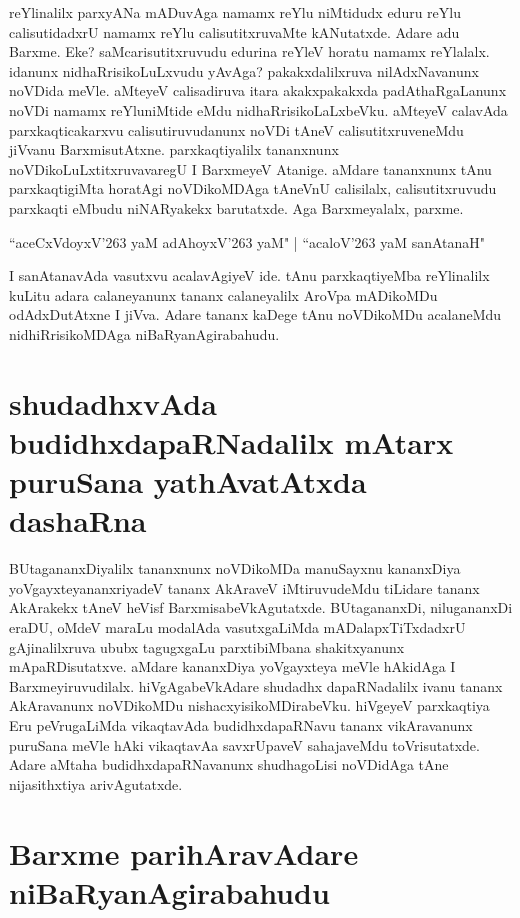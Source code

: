 reYlinalilx parxyANa mADuvAga namamx reYlu niMtidudx eduru reYlu calisutidadxrU namamx reYlu calisutitxruvaMte kANutatxde. Adare adu Barxme. Eke? saMcarisutitxruvudu edurina reYleV horatu namamx reYlalalx. idanunx nidhaRrisikoLuLxvudu yAvAga? pakakxdalilxruva nilAdxNavanunx noVDida meVle. aMteyeV calisadiruva itara akakxpakakxda padAthaRgaLanunx noVDi namamx reYluniMtide eMdu nidhaRrisikoLaLxbeVku. aMteyeV calavAda parxkaqticakarxvu calisutiruvudanunx noVDi tAneV calisutitxruveneMdu jiVvanu BarxmisutAtxne. parxkaqtiyalilx tananxnunx noVDikoLuLxtitxruvavaregU I BarxmeyeV Atanige. aMdare tananxnunx tAnu parxkaqtigiMta horatAgi noVDikoMDAga tAneVnU calisilalx, calisutitxruvudu parxkaqti eMbudu niNARyakekx barutatxde. Aga Barxmeyalalx, parxme.

\begin{shloka}
``aceCxVdoyxV\char'263 yaM adAhoyxV\char'263 yaM" | ``acaloV\char'263 yaM sanAtanaH"\label{36}
\end{shloka}

I sanAtanavAda vasutxvu acalavAgiyeV ide. tAnu parxkaqtiyeMba reYlinalilx kuLitu adara calaneyanunx tananx calaneyalilx AroVpa mADikoMDu odAdxDutAtxne I jiVva. Adare tananx kaDege tAnu noVDikoMDu acalaneMdu nidhiRrisikoMDAga niBaRyanAgirabahudu.

\section*{shudadhxvAda budidhxdapaRNadalilx mAtarx puruSana yathAvatAtxda dashaRna}

BUtagananxDiyalilx  tananxnunx noVDikoMDa manuSayxnu kananxDiya yoVgayxteyananxriyadeV tananx AkAraveV iMtiruvudeMdu tiLidare tananx AkArakekx tAneV heVisf BarxmisabeVkAgutatxde. BUtagananxDi, nilugananxDi eraDU, oMdeV maraLu modalAda vasutxgaLiMda mADalapxTiTxdadxrU gAjinalilxruva ububx tagugxgaLu parxtibiMbana shakitxyanunx mApaRDisutatxve. aMdare kananxDiya yoVgayxteya meVle hAkidAga I Barxmeyiruvudilalx. hiVgAgabeVkAdare shudadhx dapaRNadalilx ivanu tananx AkAravanunx noVDikoMDu nishacxyisikoMDirabeVku. hiVgeyeV parxkaqtiya Eru peVrugaLiMda vikaqtavAda budidhxdapaRNavu tananx vikAravanunx puruSana meVle hAki vikaqtavAa savxrUpaveV sahajaveMdu toVrisutatxde. Adare aMtaha budidhxdapaRNavanunx shudhagoLisi noVDidAga tAne nijasithxtiya arivAgutatxde.

\section*{Barxme parihAravAdare niBaRyanAgirabahudu}

